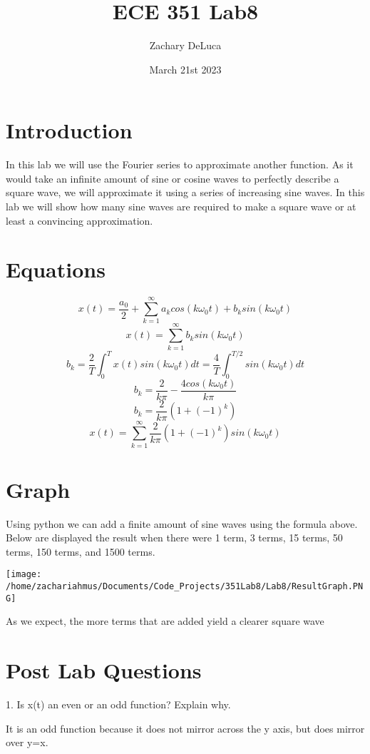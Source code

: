 \documentclass[12pt,a4paper]{article}
\title{ECE 351 Lab8}
\author{Zachary DeLuca}
\date{March 21st 2023}
\begin{document}
	
\maketitle
\hline
\section{Introduction}
	In this lab we will use the Fourier series  to approximate another function. As it would take an infinite amount of sine or cosine waves to perfectly describe a square wave, we will approximate it using a series of increasing sine waves. In this lab we will show how many sine waves are required to make a square wave or at least a convincing approximation. 

\section{Equations}
$$x(t)=\frac{a_0}{2}+\sum_{k=1}^{\infty}{a_kcos(k\omega_0t)+b_ksin(k\omega_0t)}$$
$$x(t)=\sum_{k=1}^{\infty}{b_ksin(k\omega_0t)}$$
$$b_k=\frac{2}{T}\int_0^T{x(t)sin(k\omega_0t)}dt=\frac{4}{T}\int_0^{T/2}{sin(k\omega_0t)}dt$$
$$b_k=\frac{2}{k\pi}-\frac{4cos(k\omega_0t)}{k\pi}$$
$$b_k=\frac{2}{k\pi}(1+(-1)^k)$$
$$x(t)=\sum_{k=1}^{\infty}{\frac{2}{k\pi}(1+(-1)^k)sin(k\omega_0t)}$$

\section{Graph}
Using python we can add a finite amount of sine waves using the formula above. Below are displayed the result when there were 1 term, 3 terms, 15 terms, 50 terms, 150 terms, and 1500 terms. \vspace{12pt}

\texttt{[image: /home/zachariahmus/Documents/Code\_Projects/351Lab8/Lab8/ResultGraph.PNG]}

As we expect, the more terms that are added yield a clearer square wave
\section{Post Lab Questions}

	1. Is x(t) an even or an odd function? Explain why.\vspace{6pt}
		
	     It is an odd function because it does not mirror across the y axis, but does mirror over y=x.\vspace{6pt}
		
\end{document}
